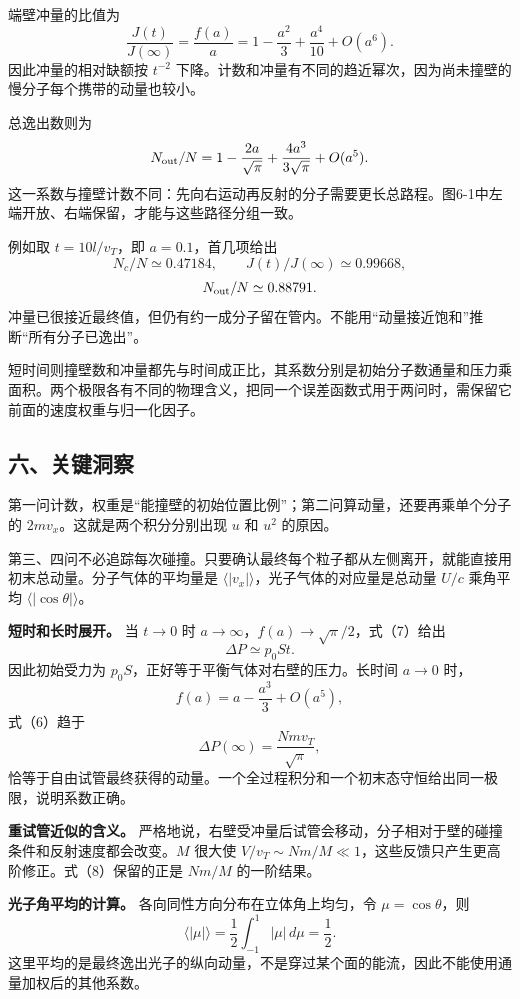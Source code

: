 \documentclass[12pt,a4paper,UTF8]{ctexart}
\begin{document}
端壁冲量的比值为 \[
\frac{J(t)}{J(\infty)}=\frac{f(a)}a
=1-\frac{a^2}{3}+\frac{a^4}{10}+O(a^6).
\] 因此冲量的相对缺额按 \(t^{-2}\)
下降。计数和冲量有不同的趋近幂次，因为尚未撞壁的慢分子每个携带的动量也较小。

总逸出数则为 \[
N_{\rm out}/N=1-\frac{2a}{\sqrt\pi}+
\frac{4a^3}{3\sqrt\pi}+O(a^5).
\]
这一系数与撞壁计数不同：先向右运动再反射的分子需要更长总路程。图6-1中左端开放、右端保留，才能与这些路径分组一致。

例如取 \(t=10l/v_T\)，即 \(a=0.1\)，首几项给出 \[
N_c/N\simeq0.47184,
\qquad J(t)/J(\infty)\simeq0.99668,
\] \[
N_{\rm out}/N\simeq0.88791.
\]
冲量已很接近最终值，但仍有约一成分子留在管内。不能用``动量接近饱和''推断``所有分子已逸出''。

短时间则撞壁数和冲量都先与时间成正比，其系数分别是初始分子数通量和压力乘面积。两个极限各有不同的物理含义，把同一个误差函数式用于两问时，需保留它前面的速度权重与归一化因子。

\subsection{六、关键洞察}\label{ux516dux5173ux952eux6d1eux5bdf-5}

第一问计数，权重是``能撞壁的初始位置比例''；第二问算动量，还要再乘单个分子的
\(2mv_x\)。这就是两个积分分别出现 \(u\) 和 \(u^2\) 的原因。

第三、四问不必追踪每次碰撞。只要确认最终每个粒子都从左侧离开，就能直接用初末总动量。分子气体的平均量是
\(\langle|v_x|\rangle\)，光子气体的对应量是总动量 \(U/c\) 乘角平均
\(\langle|\cos\theta|\rangle\)。

\textbf{短时和长时展开。} 当 \(t\to0\) 时
\(a\to\infty\)，\(f(a)\to\sqrt\pi/2\)，式（7）给出 \[
\Delta P\simeq p_0St.
\] 因此初始受力为 \(p_0S\)，正好等于平衡气体对右壁的压力。长时间
\(a\to0\) 时， \[
f(a)=a-\frac{a^3}{3}+O(a^5),
\] 式（6）趋于 \[
\Delta P(\infty)=\frac{Nmv_T}{\sqrt\pi},
\]
恰等于自由试管最终获得的动量。一个全过程积分和一个初末态守恒给出同一极限，说明系数正确。

\textbf{重试管近似的含义。}
严格地说，右壁受冲量后试管会移动，分子相对于壁的碰撞条件和反射速度都会改变。\(M\)
很大使
\(V/v_T\sim Nm/M\ll1\)，这些反馈只产生更高阶修正。式（8）保留的正是
\(Nm/M\) 的一阶结果。

\textbf{光子角平均的计算。} 各向同性方向分布在立体角上均匀，令
\(\mu=\cos\theta\)，则 \[
\langle|\mu|\rangle
=\frac12\int_{-1}^{1}|\mu|\,d\mu
=\frac12.
\]
这里平均的是最终逸出光子的纵向动量，不是穿过某个面的能流，因此不能使用通量加权后的其他系数。
\end{document}

